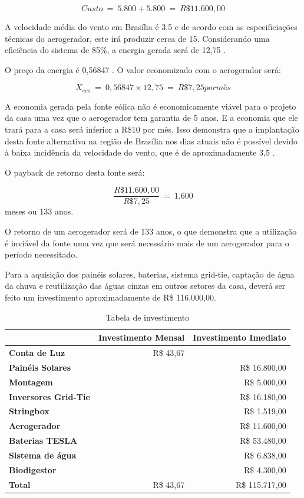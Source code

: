 $$Custo\ =\ 5.800 + 5.800\ =\ R\$ 11.600,00$$

A velocidade média do vento em Brasília é 3.5\nicefrac{\si{\meter}}{\si{\second}} e de acordo com as especificiações técnicas
do aerogerador, este irá produzir cerca de 15. Considerando uma eficiência do sistema
de 85\%, a energia gerada será de 12,75 .

O preço da energia é 0,56847 . O valor economizado com o aerogerador será:

$$X_{eco}\ =\ 0,56847\times12,75\ =\ R\$7,25 por mês$$

A economia gerada pela fonte eólica não é economicamente viável para o projeto da casa uma
vez que o aerogerador tem garantia de 5 anos. E a economia que ele trará para a casa será
inferior a R\$10 por mês. Isso demonstra que a implantação desta fonte alternativa na região de
Brasília nos dias atuais não é possível devido à baixa incidência da velocidade do vento, que é
de aproximadamente 3,5 \nicefrac{\si{\meter}}{\si{\second}}.

O payback de retorno desta fonte será:

$$\dfrac{R\$ 11.600,00}{R\$ 7,25}\ =\ 1.600$$ meses ou 133 anos.

O retorno de um aerogerador será de 133 anos, o que demonstra que a utilização é
inviável da fonte uma vez que será necessário mais de um aerogerador para o período
necessitado.

Para a aquisição dos painéis solares, baterias, sistema grid-tie, captação de água da
chuva e reutilização das águas cinzas em outros setores da casa, deverá ser feito um
investimento aproximadamente de R\$ 116.000,00.

\begin{table}[H]
\centering
\begin{tabular}{|l|r|r|}
\cline{2-3} 
\multicolumn{1}{l|}{} & \textbf{Investimento Mensal} & \textbf{Investimento Imediato}\tabularnewline
\hline 
\textbf{Conta de Luz} & R\$ 43,67 & \tabularnewline
\hline 
\textbf{Painéis Solares} &  & R\$ 16.800,00\tabularnewline
\hline 
\textbf{Montagem} &  & R\$ 5.000,00\tabularnewline
\hline 
\textbf{Inversores Grid-Tie} &  & R\$ 16.180,00\tabularnewline
\hline 
\textbf{Stringbox} &  & R\$ 1.519,00\tabularnewline
\hline 
\textbf{Aerogerador} &  & R\$ 11.600,00\tabularnewline
\hline 
\textbf{Baterias TESLA} &  & R\$ 53.480,00\tabularnewline
\hline 
\textbf{Sistema de água} &  & R\$ 6.838,00\tabularnewline
\hline 
\textbf{Biodigestor} &  & R\$ 4.300,00\tabularnewline
\hline 
\textbf{Total} & R\$ 43,67 & R\$ 115.717,00\tabularnewline
\hline 
\end{tabular}
\caption{Tabela de investimento}
\end{table}








